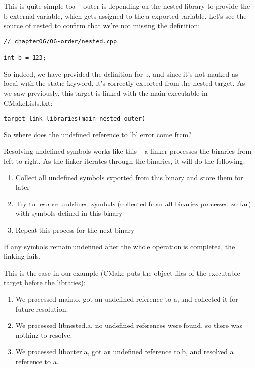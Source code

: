 This is quite simple too – outer is depending on the nested library to provide the b external variable, which gets assigned to the a exported variable. Let's see the source of nested to confirm that we're not missing the definition:

\begin{lstlisting}[style=styleCXX]
// chapter06/06-order/nested.cpp

int b = 123;
\end{lstlisting}

So indeed, we have provided the definition for b, and since it's not marked as local with the static keyword, it's correctly exported from the nested target. As we saw previously, this target is linked with the main executable in CMakeLists.txt:

\begin{lstlisting}[style=styleCMake]
target_link_libraries(main nested outer)
\end{lstlisting}

So where does the undefined reference to 'b' error come from?

Resolving undefined symbols works like this – a linker processes the binaries from left to right. As the linker iterates through the binaries, it will do the following:

\begin{enumerate}
\item 
Collect all undefined symbols exported from this binary and store them for later

\item 
Try to resolve undefined symbols (collected from all binaries processed so far) with symbols defined in this binary

\item 
Repeat this process for the next binary
\end{enumerate}

If any symbols remain undefined after the whole operation is completed, the linking fails.

This is the case in our example (CMake puts the object files of the executable target before the libraries):

\begin{enumerate}
\item 
We processed main.o, got an undefined reference to a, and collected it for future resolution.

\item 
We processed libnested.a, no undefined references were found, so there was nothing to resolve.

\item 
We processed libouter.a, got an undefined reference to b, and resolved a reference to a.
\end{enumerate}

